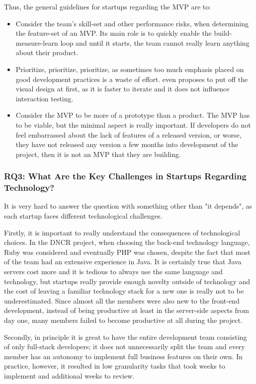 \documentclass{article}
\begin{document}
Thus, the general guidelines for startups regarding the MVP are to:
\begin{itemize}
\item Consider the team's skill-set and other performance risks, when determining the feature-set of an MVP. Its main role is to quickly enable the build-measure-learn loop and until it starts, the team cannot really learn anything about their product.
\item Prioritize, prioritize, prioritize, as sometimes too much emphasis placed on good development practices is a waste of effort. \cite{klein2013ux} even proposes to put off the visual design at first, as it is faster to iterate and it does not influence interaction testing.
\item Consider the MVP to be more of a prototype than a product. The MVP has to be viable, but the minimal aspect is really important. If developers do not feel embarrassed about the lack of features of a released version, or worse, they have not released any version a few months into development of the project, then it is not an MVP that they are building.
\end{itemize}

\subsubsection{RQ3: What Are the Key Challenges in Startups Regarding Technology?}
It is very hard to answer the question with something other than "it depends", as each startup faces different technological challenges.

Firstly, it is important to really understand the consequences of technological choices. In the DNCR project, when choosing the back-end technology language, Ruby was considered and eventually PHP was chosen, despite the fact that most of the team had an extensive experience in Java. It is certainly true that Java servers cost more and it is tedious to always use the same language and technology, but startups really provide enough novelty outside of technology and the cost of leaving a familiar technology stack for a new one is really not to be underestimated. Since almost all the members were also new to the front-end development, instead of being productive at least in the server-side aspects from day one, many members failed to become productive at all during the project.

Secondly, in principle it is great to have the entire development team consisting of only full-stack developers; it does not unnecessarily split the team and every member has an autonomy to implement full business features on their own. In practice, however, it resulted in low granularity tasks that took weeks to implement and additional weeks to review.
\end{document}
